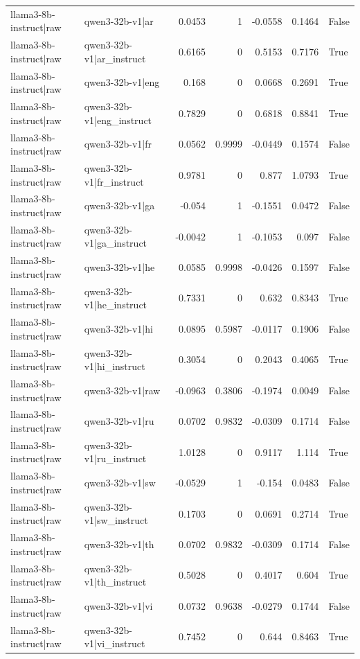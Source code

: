 \begin{table}
\begin{tabular}{l l r r r r l}
llama3-8b-instruct|raw & qwen3-32b-v1|ar & 0.0453 & 1 & -0.0558 & 0.1464 & False \\
llama3-8b-instruct|raw & qwen3-32b-v1|ar_instruct & 0.6165 & 0 & 0.5153 & 0.7176 & True \\
llama3-8b-instruct|raw & qwen3-32b-v1|eng & 0.168 & 0 & 0.0668 & 0.2691 & True \\
llama3-8b-instruct|raw & qwen3-32b-v1|eng_instruct & 0.7829 & 0 & 0.6818 & 0.8841 & True \\
llama3-8b-instruct|raw & qwen3-32b-v1|fr & 0.0562 & 0.9999 & -0.0449 & 0.1574 & False \\
llama3-8b-instruct|raw & qwen3-32b-v1|fr_instruct & 0.9781 & 0 & 0.877 & 1.0793 & True \\
llama3-8b-instruct|raw & qwen3-32b-v1|ga & -0.054 & 1 & -0.1551 & 0.0472 & False \\
llama3-8b-instruct|raw & qwen3-32b-v1|ga_instruct & -0.0042 & 1 & -0.1053 & 0.097 & False \\
llama3-8b-instruct|raw & qwen3-32b-v1|he & 0.0585 & 0.9998 & -0.0426 & 0.1597 & False \\
llama3-8b-instruct|raw & qwen3-32b-v1|he_instruct & 0.7331 & 0 & 0.632 & 0.8343 & True \\
llama3-8b-instruct|raw & qwen3-32b-v1|hi & 0.0895 & 0.5987 & -0.0117 & 0.1906 & False \\
llama3-8b-instruct|raw & qwen3-32b-v1|hi_instruct & 0.3054 & 0 & 0.2043 & 0.4065 & True \\
llama3-8b-instruct|raw & qwen3-32b-v1|raw & -0.0963 & 0.3806 & -0.1974 & 0.0049 & False \\
llama3-8b-instruct|raw & qwen3-32b-v1|ru & 0.0702 & 0.9832 & -0.0309 & 0.1714 & False \\
llama3-8b-instruct|raw & qwen3-32b-v1|ru_instruct & 1.0128 & 0 & 0.9117 & 1.114 & True \\
llama3-8b-instruct|raw & qwen3-32b-v1|sw & -0.0529 & 1 & -0.154 & 0.0483 & False \\
llama3-8b-instruct|raw & qwen3-32b-v1|sw_instruct & 0.1703 & 0 & 0.0691 & 0.2714 & True \\
llama3-8b-instruct|raw & qwen3-32b-v1|th & 0.0702 & 0.9832 & -0.0309 & 0.1714 & False \\
llama3-8b-instruct|raw & qwen3-32b-v1|th_instruct & 0.5028 & 0 & 0.4017 & 0.604 & True \\
llama3-8b-instruct|raw & qwen3-32b-v1|vi & 0.0732 & 0.9638 & -0.0279 & 0.1744 & False \\
llama3-8b-instruct|raw & qwen3-32b-v1|vi_instruct & 0.7452 & 0 & 0.644 & 0.8463 & True \\

\end{tabular}
\end{table}
